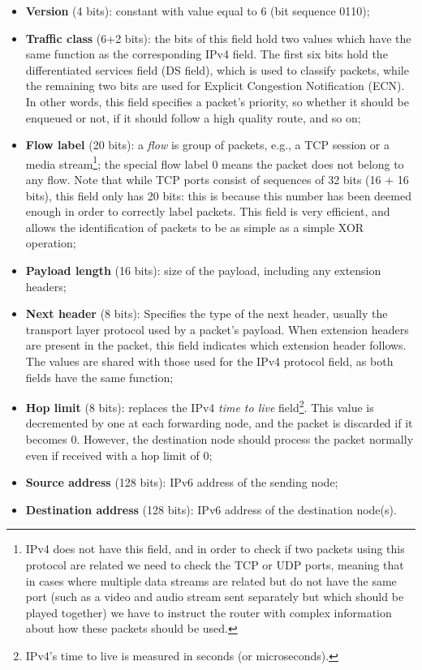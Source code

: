\begin{itemize}
    \item \textbf{Version} (4 bits): constant with value equal to 6 (bit sequence 0110);
    \item \textbf{Traffic class} (6+2 bits): the bits of this field hold two values which have the same function as the corresponding IPv4 field. The first six bits hold the differentiated services field (DS field), which is used to classify packets, while the remaining two bits are used for Explicit Congestion Notification (ECN). In other words, this field specifies a packet's priority, so whether it should be enqueued or not, if it should follow a high quality route, and so on;
    \item \textbf{Flow label} (20 bits): a \textit{flow} is group of packets, e.g., a TCP session or a media stream\footnote{IPv4 does not have this field, and in order to check if two packets using this protocol are related we need to check the TCP or UDP ports, meaning that in cases where multiple data streams are related but do not have the same port (such as a video and audio stream sent separately but which should be played together) we have to instruct the router with complex information about how these packets should be used.}; the special flow label 0 means the packet does not belong to any flow. Note that while TCP ports consist of sequences of 32 bits (16 + 16 bits), this field only has 20 bits: this is because this number has been deemed enough in order to correctly label packets. This field is very efficient, and allows the identification of packets to be as simple as a simple XOR operation;
    \item \textbf{Payload length} (16 bits): size of the payload, including any extension headers;
    \item \textbf{Next header} (8 bits): Specifies the type of the next header, usually the transport layer protocol used by a packet's payload. When extension headers are present in the packet, this field indicates which extension header follows. The values are shared with those used for the IPv4 protocol field, as both fields have the same function;
    \item \textbf{Hop limit} (8 bits): replaces the IPv4 \textit{time to live} field\footnote{IPv4's time to live is measured in seconds (or microseconds).}. This value is decremented by one at each forwarding node, and the packet is discarded if it becomes 0. However, the destination node should process the packet normally even if received with a hop limit of 0;
    \item \textbf{Source address} (128 bits): IPv6 address of the sending node;
    \item \textbf{Destination address} (128 bits): IPv6 address of the destination node(s).
\end{itemize}

